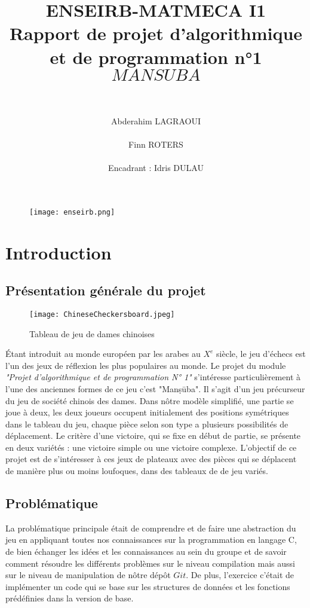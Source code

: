 \documentclass[11pt]{article}
\title{ENSEIRB-MATMECA I1\\Rapport de projet d'algorithmique et de programmation n°1  \\ $MANSUBA$}
\author{ \\ \\ Abderahim LAGRAOUI \\ \\ Finn ROTERS  \\ \\Encadrant : Idris DULAU}
\begin{document}
%
\maketitle
\begin{figure}[h]
    \centering
    \texttt{[image: enseirb.png]}
\end{figure}
\newpage
\tableofcontents
    \newpage
    \section{Introduction}
        \subsection{Présentation générale du projet}
            \begin{wrapfigure}{r}{0.35\textwidth} %
            \centering
            \texttt{[image: ChineseCheckersboard.jpeg]}
            \caption{Tableau de jeu de dames chinoises }
            \label{figure1}
            \end{wrapfigure}
            Étant introduit au monde européen par les arabes au $X^{e}$ siècle, le jeu d'échecs est l'un des jeux de réflexion les plus populaires au monde. Le projet du module \textit{"Projet d'algorithmique et de programmation N° 1"} s'intéresse particulièrement à l'une des anciennes formes de ce jeu c'est "Manṣūba". Il s'agit d'un jeu précurseur du jeu de société chinois des dames. Dans nôtre modèle simplifié, une partie se joue à deux, les deux joueurs occupent initialement des positions symétriques dans le tableau du jeu, chaque pièce selon son type a plusieurs possibilités de déplacement. Le critère d'une victoire, qui se fixe en début de partie, se présente en deux variétés : une victoire simple ou une victoire complexe.
            L'objectif de ce projet est de s'intéresser à ces jeux de plateaux avec des pièces qui se déplacent de manière plus ou moins loufoques, dans des tableaux de de jeu variés.
    
        \subsection {Problématique}
            La problématique principale était de comprendre et de faire une abstraction du jeu en appliquant toutes nos connaissances sur la programmation en langage C, de bien échanger les idées et les connaissances au sein du groupe et de savoir comment résoudre les différents problèmes sur le niveau compilation mais aussi sur le niveau de manipulation de nôtre dépôt $Git$. De plus, l'exercice c'était de implémenter un code qui se base sur les structures de données et les fonctions prédéfinies dans la version de base. 
\end{document}
